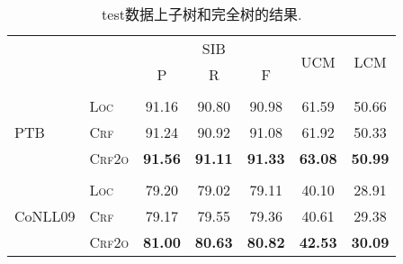 \begin{table}[tb!]
    \setlength{\tabcolsep}{5pt}
    \centering
    \begin{tabular}{llccccc}
        \toprule
                                 &                & \multicolumn{3}{c}{SIB} & \multirow{2}{*}{UCM} & \multirow{2}{*}{LCM}                                   \\
                                 &                & P                       & R                    & F                                                      \\[2pt]
        \hline
        \\[-15pt]
        \multirow{3}{*}{PTB}     & \textsc{Loc}   & 91.16                   & 90.80                & 90.98                & 61.59          & 50.66          \\
                                 & \textsc{Crf}   & 91.24                   & 90.92                & 91.08                & 61.92          & 50.33          \\
                                 & \textsc{Crf2o} & \textbf{91.56}          & \textbf{91.11}       & \textbf{91.33}       & \textbf{63.08} & \textbf{50.99} \\[2pt]
        \hline
        \\[-15pt]
        \multirow{3}{*}{CoNLL09} & \textsc{Loc}   & 79.20                   & 79.02                & 79.11                & 40.10          & 28.91          \\
                                 & \textsc{Crf}   & 79.17                   & 79.55                & 79.36                & 40.61          & 29.38          \\
                                 & \textsc{Crf2o} & \textbf{81.00}          & \textbf{80.63}       & \textbf{80.82}       & \textbf{42.53} & \textbf{30.09} \\
        \bottomrule
    \end{tabular}
    \caption{test数据上子树和完全树的结果.}
    \label{table:dev-test-subtree}
\end{table}